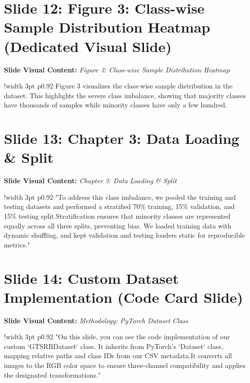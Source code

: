 \documentclass[11pt]{article}
\begin{document}
\section{Slide 12: Figure 3: Class-wise Sample Distribution Heatmap (Dedicated Visual Slide)}
\textbf{Slide Visual Content:} \textit{Figure 3: Class-wise Sample Distribution Heatmap}\\ [8pt]
\noindent
\begin{tabular}{!{\color{primary}\vrule width 3pt} p{0.92\textwidth}}
  \small\color{black!80} Figure 3 visualizes the class-wise sample distribution in the dataset. This highlights the severe class imbalance, showing that majority classes have thousands of samples while minority classes have only a few hundred.
\end{tabular}
\vspace{15pt}

\section{Slide 13: Chapter 3: Data Loading \& Split}
\textbf{Slide Visual Content:} \textit{Chapter 3: Data Loading \& Split}\\ [8pt]
\noindent
\begin{tabular}{!{\color{primary}\vrule width 3pt} p{0.92\textwidth}}
  \small\color{black!80} "To address this class imbalance, we pooled the training and testing datasets and performed a stratified 70\% training, 15\% validation, and 15\% testing split.\newline\newline Stratification ensures that minority classes are represented equally across all three splits, preventing bias. We loaded training data with dynamic shuffling, and kept validation and testing loaders static for reproducible metrics."
\end{tabular}
\vspace{15pt}

\section{Slide 14: Custom Dataset Implementation (Code Card Slide)}
\textbf{Slide Visual Content:} \textit{Methodology: PyTorch Dataset Class}\\ [8pt]
\noindent
\begin{tabular}{!{\color{primary}\vrule width 3pt} p{0.92\textwidth}}
  \small\color{black!80} "On this slide, you can see the code implementation of our custom `GTSRBDataset` class. It inherits from PyTorch's `Dataset` class, mapping relative paths and class IDs from our CSV metadata.\newline\newline It converts all images to the RGB color space to ensure three-channel compatibility and applies the designated transformations."
\end{tabular}
\vspace{15pt}
\end{document}
